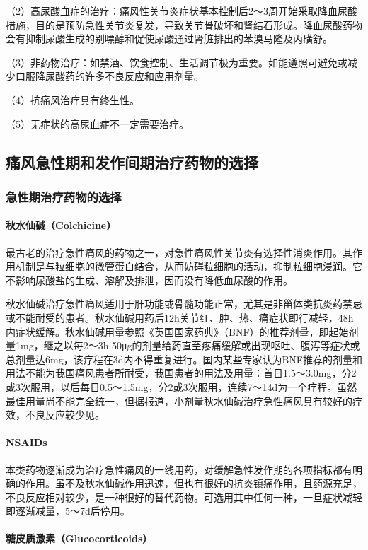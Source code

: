 （2）高尿酸血症的治疗：痛风性关节炎症状基本控制后2～3周开始采取降血尿酸措施，目的是预防急性关节炎复发，导致关节骨破坏和肾结石形成。降血尿酸药物会有抑制尿酸生成的别嘌醇和促使尿酸通过肾脏排出的苯溴马隆及丙磺舒。

（3）非药物治疗：如禁酒、饮食控制、生活调节极为重要。如能遵照可避免或减少口服降尿酸药的许多不良反应和应用剂量。

（4）抗痛风治疗具有终生性。

（5）无症状的高尿血症不一定需要治疗。

\subsection{痛风急性期和发作间期治疗药物的选择}

\subsubsection{急性期治疗药物的选择}
\paragraph{秋水仙碱（Colchicine）}

最古老的治疗急性痛风的药物之一，对急性痛风性关节炎有选择性消炎作用。其作用机制是与粒细胞的微管蛋白结合，从而妨碍粒细胞的活动，抑制粒细胞浸润。它不影响尿酸盐的生成、溶解及排泄，因而没有降低血尿酸的作用。

秋水仙碱治疗急性痛风适用于肝功能或骨髓功能正常，尤其是非甾体类抗炎药禁忌或不能耐受的患者。秋水仙碱用药后12h关节红、肿、热、痛症状即行减轻，48h内症状缓解。秋水仙碱用量参照《英国国家药典》（BNF）的推荐剂量，即起始剂量1mg，继之以每2～3h
50μg的剂量给药直至疼痛缓解或出现呕吐、腹泻等症状或总剂量达6mg，该疗程在3d内不得重复进行。国内某些专家认为BNF推荐的剂量和用法不能为我国痛风患者所耐受，我国患者的用法及用量：首日1.5～3.0mg，分2或3次服用，以后每日0.5～1.5mg，分2或3次服用，连续7～14d为一个疗程。虽然最佳用量尚不能完全统一，但据报道，小剂量秋水仙碱治疗急性痛风具有较好的疗效，不良反应较少见。
\paragraph{NSAIDs}

本类药物逐渐成为治疗急性痛风的一线用药，对缓解急性发作期的各项指标都有明确的作用。虽不及秋水仙碱作用迅速，但也有很好的抗炎镇痛作用，且药源充足，不良反应相对较少，是一种很好的替代药物。可选用其中任何一种，一旦症状减轻即逐渐减量，5～7d后停用。
\paragraph{糖皮质激素（Glucocorticoids）}

